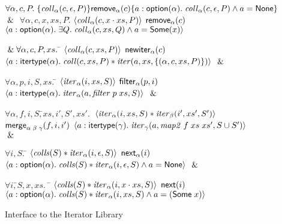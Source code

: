 \begin{figure}
\begin{specification}

\> $\forall \alpha, c, P.\; \{{\mathit{coll}_\alpha(c, \epsilon, P)}\}{{\mathsf{remove}_\alpha(c)}}\{{a:\mathsf{option }{(\alpha)}}.\;{\mathit{coll}_\alpha(c, \epsilon, P) \land a = \mathsf{None}}\}$
$\;\&\;$ 
\> $\forall \alpha, c, x, xs, P.$\=
          $\left<{\mathit{coll}_\alpha(c, x\cdot xs, P)}\right>$ 
\nextline
\>\> ${\mathsf{remove}_\alpha(c)}$ 
\nextline
\>\> $\left<{a:\mathsf{option }{(\alpha)}.\;
             \exists Q.\;\mathit{coll}_\alpha(c, xs, Q) \land a = \mathsf{Some}(x)}\right>$ 

\> $\;\&\; \forall \alpha, c, P, xs.\;$\=
            $\left<{\mathit{coll}_\alpha(c, xs, P)}\right>$ 
\nextline
\>\>${\mathsf{newiter}_\alpha(c)}$
\nextline
\>\>$\left<{a:\mathsf{itertype}(\alpha).\; \mathit{coll}(c, xs, P) * \mathit{iter}(a, xs, \{{(\alpha, c, xs, P)}\})}\right>$ $\;\&\;$ 

 \> $\forall \alpha, p, i, S, xs.\;$\=
         $\left<{\mathit{iter}_\alpha(i, xs, S)}\right>$ 
\nextline
\>\>   ${\mathsf{filter}_\alpha(p, i)}$
\nextline
\>\>   $\left<{a:\mathsf{itertype}(\alpha).\; \mathit{iter}_\alpha(a, \mathit{filter}\; p\;xs, S)}\right>$ $\;\&\;$ 

 \> $\forall \alpha, f, i, S,$\=$ xs, i', S', xs'.\;$ 
\nextline
 \> \> 
     $\left<{\mathit{iter}_\alpha(i, xs, S) * \mathit{iter}_\beta(i', xs', S')}\right>$ %
\nextline
 \> \> ${\mathsf{merge}_{\alpha\;\beta\;\gamma}(f, i, i')}$ 
\nextline
 \> \> $\left<{a:\mathsf{itertype}(\gamma).\; \mathit{iter}_{\gamma}(a, \mathit{map2}\;f\;xs\;xs', S \cup S')}\right>$ $\;\&\;$ 

 \> $\forall i, S.\;$\=
      $\left<{\mathit{colls}(S) * \mathit{iter}_\alpha(i, \epsilon, S)}\right>$
\nextline  
\>\>${\mathsf{next}_\alpha(i)}$ 
\nextline
\>\>$\left<{a:\mathsf{option }{(\alpha)}.\; \mathit{colls}(S) * \mathit{iter}_\alpha(i, \epsilon, S) \land a = \mathsf{None}}\right>$ $\;\&\;$ 

 \> $\forall i, $\=$ S, x, xs.\;$ \= 
      $\left<{\mathit{colls}(S) * \mathit{iter}_\alpha(i, x \cdot xs, S)}\right>$
\nextline
\>\>\>${\mathsf{next}(i)}$
\nextline
\>\>\>$\left<{a:\mathsf{option }{(\alpha)}.\; 
              \mathit{colls}(S) * \mathit{iter}_\alpha(i, xs, S) \land a = (\mathsf{Some}\;x)}\right>$ 

\end{specification}
\caption{Interface to the Iterator Library}
\label{iterator-interface}
\end{figure}


